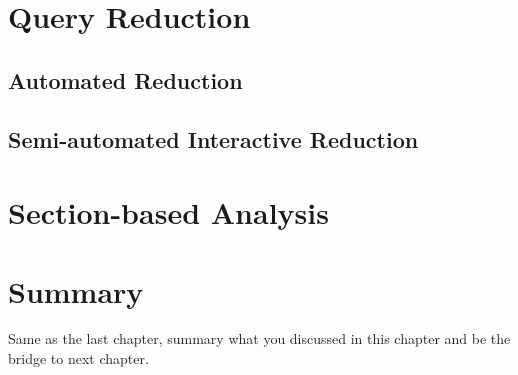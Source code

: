 \section{Query Reduction}

\subsection{Automated Reduction}
\subsection{Semi-automated Interactive Reduction}

\section{Section-based Analysis}

\section{Summary}
Same as the last chapter, summary what you discussed in this chapter and
be the bridge to next chapter.
